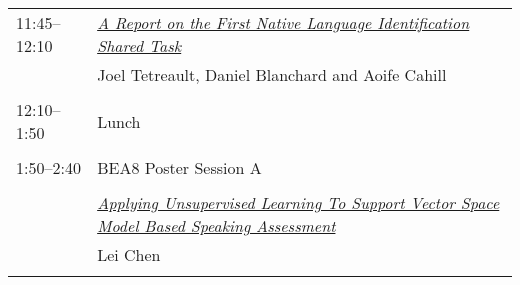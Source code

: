 \begin{tabular}{p{20mm}p{128mm}}
11:45--12:10 & \hyperlink{page.48}{\em A Report on the First Native Language Identification Shared Task}\\
         & Joel Tetreault, Daniel Blanchard and Aoife Cahill \\
\\

12:10--1:50 & Lunch
 \\
\\
1:50--2:40 & BEA8 Poster Session A
 \\
\\
 & \hyperlink{page.58}{\em Applying Unsupervised Learning To Support Vector Space Model Based Speaking Assessment}\\
         & Lei Chen \\
\\

\end{tabular}
\newpage
